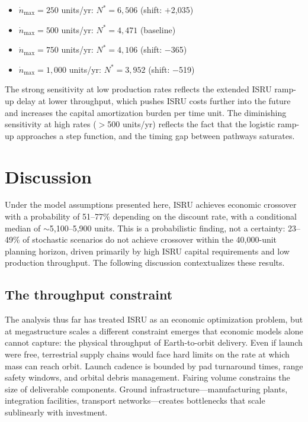 \documentclass[preprint,12pt]{elsarticle}
\begin{document}
\begin{itemize}
\item $\dot{n}_{\max} = 250$ units/yr: $N^* = 6{,}506$ (shift: $+$2{,}035)
\item $\dot{n}_{\max} = 500$ units/yr: $N^* = 4{,}471$ (baseline)
\item $\dot{n}_{\max} = 750$ units/yr: $N^* = 4{,}106$ (shift: $-$365)
\item $\dot{n}_{\max} = 1{,}000$ units/yr: $N^* = 3{,}952$ (shift: $-$519)
\end{itemize}

The strong sensitivity at low production rates reflects the extended ISRU ramp-up delay at lower throughput, which pushes ISRU costs further into the future and increases the capital amortization burden per time unit. The diminishing sensitivity at high rates ($>$500 units/yr) reflects the fact that the logistic ramp-up approaches a step function, and the timing gap between pathways saturates.

\section{Discussion}
\label{sec:discussion}

Under the model assumptions presented here, ISRU achieves economic crossover with a probability of 51--77\% depending on the discount rate, with a conditional median of $\sim$5{,}100--5{,}900 units. This is a probabilistic finding, not a certainty: 23--49\% of stochastic scenarios do not achieve crossover within the 40{,}000-unit planning horizon, driven primarily by high ISRU capital requirements and low production throughput. The following discussion contextualizes these results.

\subsection{The throughput constraint}

The analysis thus far has treated ISRU as an economic optimization problem, but at megastructure scales a different constraint emerges that economic models alone cannot capture: the physical throughput of Earth-to-orbit delivery. Even if launch were free, terrestrial supply chains would face hard limits on the rate at which mass can reach orbit. Launch cadence is bounded by pad turnaround times, range safety windows, and orbital debris management. Fairing volume constrains the size of deliverable components. Ground infrastructure---manufacturing plants, integration facilities, transport networks---creates bottlenecks that scale sublinearly with investment.
\end{document}
